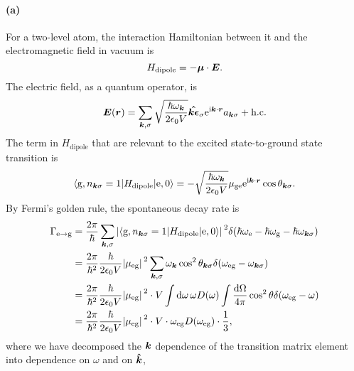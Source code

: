 \documentclass[hyperref, a4paper]{article}
\newcommand*{\ii}{\mathrm{i}}
\newcommand*{\ee}{\mathrm{e}}
\newcommand*{\omegae}{\omega_{\text{e}}}
\newcommand*{\omegag}{\omega_{\text{g}}}
\newcommand*{\omegaeg}{\omega_{\text{eg}}}
\newcommand*{\mueg}{\mu_{\text{eg}}}
\newcommand*{\muge}{\mu_{\text{ge}}}
\begin{document}
\paragraph{(a)} For a two-level atom, 
the interaction Hamiltonian between it and the electromagnetic field in vacuum is 
\begin{equation}
    H_{\text{dipole}} = - \vb*{\mu} \cdot \vb*{E}.
\end{equation}
The electric field, as a quantum operator, is 
\begin{equation}
    \vb*{E}(\vb*{r}) = \sum_{\vb*{k}, \sigma}
    \sqrt{\frac{\hbar \omega_{\vb*{k}}}{2 \epsilon_0 V}}
    \vu*{\vb*{k} \epsilon}_\sigma \ee^{\ii \vb*{k} \cdot \vb*{r}} a_{\vb*{k} \sigma} 
    + \text{h.c.}
\end{equation}
The term in $H_{\text{dipole}}$ that are relevant to 
the excited state-to-ground state transition is  
\begin{equation}
    \mel**{\text{g}, n_{\vb*{k} \sigma} = 1}{H_{\text{dipole}}}{\text{e}, 0}
    = - \sqrt{\frac{\hbar \omega_{\vb*{k}}}{2 \epsilon_0 V}} 
    \muge \ee^{\ii \vb*{k} \cdot \vb*{r}} \cos \theta_{\vb*{k} \sigma}.
\end{equation}
By Fermi's golden rule, the spontaneous decay rate is 
\begin{equation}
    \begin{aligned}
        \Gamma_{\text{e} \to \text{g}} &= 
        \frac{2\pi}{\hbar} \sum_{\vb*{k}, \sigma} 
        \abs*{
            \mel**{\text{g}, n_{\vb*{k} \sigma} = 1}{H_{\text{dipole}}}{\text{e}, 0}
        }^2
        \delta(\hbar \omegae - \hbar \omegag - \hbar \omega_{\vb*{k} \sigma}) \\
        &= \frac{2\pi}{\hbar^2} \frac{\hbar}{2 \epsilon_0 V}  \abs*{\mueg}^2 
        \sum_{\vb*{k}, \sigma} \omega_{\vb*{k}}
        \cos^2 \theta_{\vb*{k} \sigma} 
        \delta(\omegaeg - \omega_{\vb*{k} \sigma}) \\
        &= \frac{2\pi}{\hbar^2} \frac{\hbar}{2 \epsilon_0 V} \abs*{\mueg}^2 
        \cdot V \int \dd{\omega} \omega D(\omega) \int \frac{\dd{\Omega}}{4\pi} 
        \cos^2 \theta
        \delta(\omegaeg - \omega)  \\
        &= \frac{2\pi}{\hbar^2} \frac{\hbar}{2 \epsilon_0 V} \abs*{\mueg}^2 
        \cdot V \cdot \omegaeg D(\omegaeg) \cdot \frac{1}{3} ,
    \end{aligned}
\end{equation}
where we have decomposed the $\vb*{k}$ dependence 
of the transition matrix element 
into dependence on $\omega$ and on $\vu*{k}$,
\end{document}
